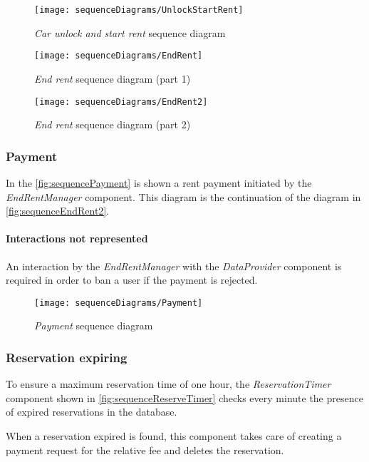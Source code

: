 \begin{figure}[h!]
	\centering
	\texttt{[image: sequenceDiagrams/UnlockStartRent]}
	\caption{
		\label{fig:sequenceUnlockStartRent} 
		\emph{Car unlock and start rent} sequence diagram
	}
\end{figure}
\begin{figure}[h!]
	\centering
	\texttt{[image: sequenceDiagrams/EndRent]}
	\caption{
		\label{fig:sequenceEndRent1} 
		\emph{End rent} sequence diagram (part 1)
	}
\end{figure}
\begin{figure}[h!]
	\centering
	\texttt{[image: sequenceDiagrams/EndRent2]}
	\caption{
		\label{fig:sequenceEndRent2} 
		\emph{End rent} sequence diagram (part 2)
	}
\end{figure}

\clearpage
\subsubsection{Payment}
In the \autoref{fig:sequencePayment} is shown a rent payment initiated by the \emph{EndRentManager} component. This diagram is the continuation of the diagram in \autoref{fig:sequenceEndRent2}.

\paragraph{Interactions not represented} An interaction by the \emph{EndRentManager} with the \emph{DataProvider} component is required in order to ban a user if the payment is rejected.
\begin{figure}[h!]
	\centering
	\texttt{[image: sequenceDiagrams/Payment]}
	\caption{
		\label{fig:sequencePayment} 
		\emph{Payment} sequence diagram
	}
\end{figure}

\clearpage
\subsubsection{Reservation expiring}
To ensure a maximum reservation time of one hour, the \emph{ReservationTimer} component shown in \autoref{fig:sequenceReserveTimer} checks every minute the presence of expired reservations in the database. 

When a reservation expired is found, this component takes care of creating a payment request for the relative fee and deletes the reservation. 

